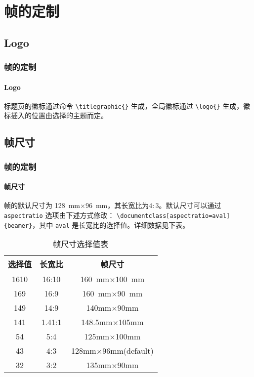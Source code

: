\documentclass{beamer}
\begin{document}
\section{帧的定制}
\subsection{Logo}
\begin{frame}[containsverbatim]
\frametitle{帧的定制}
\framesubtitle{Logo}
标题页的徽标通过命令 \verb|\titlegraphic{}| 生成，全局徽标通过 \verb|\logo{}| 生成，徽标插入的位置由选择的主题而定。
\end{frame}

\subsection{帧尺寸}
\begin{frame}[containsverbatim]
\frametitle{帧的定制}
\framesubtitle{帧尺寸}
帧的默认尺寸为 \SI{128}{\milli\metre}$\times$\SI{96}{\milli\metre}，其长宽比为$4:3$。默认尺寸可以通过 \verb|aspectratio| 选项由下述方式修改： \verb|\documentclass[aspectratio=aval]{beamer}|，其中 \verb|aval| 是长宽比的选择值。详细数据见下表。
\end{frame}
\begin{frame}
\begin{table}
\begin{tabular}{ccc}
\toprule
选择值 & 长宽比 & 帧尺寸\\
\midrule
1610   & 16:10  & \SI{160}{\milli\metre}$\times$\SI{100}{\milli\metre}\\
\midrule
169    & 16:9   & \SI{160}{\milli\metre}$\times$\SI{90}{\milli\metre}\\
\midrule
149    & 14:9   & 140mm$\times$90mm\\
\midrule
141    & 1.41:1 & 148.5mm$\times$105mm\\
\midrule
54     & 5:4    & 125mm$\times$100mm\\
\midrule
43     & 4:3    & 128mm$\times$96mm(default)\\
\midrule
32     & 3:2    &135mm$\times$90mm\\
\bottomrule
\end{tabular}
\caption{帧尺寸选择值表}
\end{table}
\end{frame}
\end{document}

